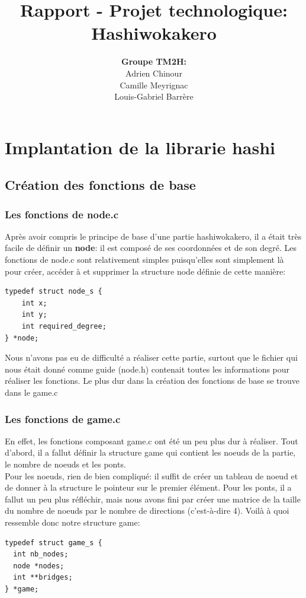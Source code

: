 \documentclass[12pt]{report}
\title{\textbf{Rapport - Projet technologique:\\Hashiwokakero}}
\author{\textbf{Groupe TM2H:}\\Adrien Chinour\\ Camille Meyrignac\\ Louis-Gabriel Barrère}
\begin{document}
\maketitle

\tableofcontents

\chapter{Implantation de la librarie hashi}

\section{Création des fonctions de base}

\subsection{Les fonctions de node.c}
\textnormal{Après avoir compris le principe de base d'une partie hashiwokakero, il a était très facile de définir un \textbf{node}: il est composé de ses coordonnées et de son degré. Les fonctions de node.c sont relativement simples puisqu'elles sont simplement là pour créer, accéder à et supprimer la structure node définie de cette manière:}
\begin{verbatim}
typedef struct node_s {
	int x;
	int y;
	int required_degree;
} *node;
\end{verbatim}

\textnormal{Nous n'avons pas eu de difficulté a réaliser cette partie, surtout que le fichier qui nous était donné comme guide (node.h) contenait toutes les informations pour réaliser les fonctions. Le plus dur dans la création des fonctions de base se trouve dans le game.c}
\subsection{Les fonctions de game.c}
\textnormal{En effet, les fonctions composant game.c ont été un peu plus dur à réaliser. Tout d'abord, il a fallut définir la structure game qui contient les noeuds de la partie, le nombre de noeuds et les ponts.\\ Pour les noeuds, rien de bien compliqué: il suffit de créer un tableau de noeud et de donner à la structure le pointeur sur le premier élément. Pour les ponts, il a fallut un peu plus réfléchir, mais nous avons fini par créer une matrice de la taille du nombre de noeuds par le nombre de directions (c'est-à-dire 4). Voilà à quoi ressemble donc notre structure game:}
\begin{verbatim}
typedef struct game_s {
  int nb_nodes;
  node *nodes;
  int **bridges;
} *game;
\end{verbatim}
\end{document}
